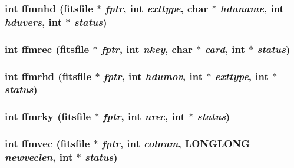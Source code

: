 \subsubsection{\setlength{\rightskip}{0pt plus 5cm}int ffmnhd (\bf{fitsfile} $\ast$ {\em fptr}, int {\em exttype}, char $\ast$ {\em hduname}, int {\em hduvers}, int $\ast$ {\em status})}\label{test_2roimasker_2fitsio_8h_84dd226ce5315b62afba4631346d486f}


\subsubsection{\setlength{\rightskip}{0pt plus 5cm}int ffmrec (\bf{fitsfile} $\ast$ {\em fptr}, int {\em nkey}, char $\ast$ {\em card}, int $\ast$ {\em status})}\label{test_2roimasker_2fitsio_8h_64f0b7aa1396fb5dc63502db966f8acd}


\subsubsection{\setlength{\rightskip}{0pt plus 5cm}int ffmrhd (\bf{fitsfile} $\ast$ {\em fptr}, int {\em hdumov}, int $\ast$ {\em exttype}, int $\ast$ {\em status})}\label{test_2roimasker_2fitsio_8h_d81f4e1c55fec210faa6343d3ed455ce}


\subsubsection{\setlength{\rightskip}{0pt plus 5cm}int ffmrky (\bf{fitsfile} $\ast$ {\em fptr}, int {\em nrec}, int $\ast$ {\em status})}\label{test_2roimasker_2fitsio_8h_d22c9244b2bef12cd893ff4e514f49fb}


\subsubsection{\setlength{\rightskip}{0pt plus 5cm}int ffmvec (\bf{fitsfile} $\ast$ {\em fptr}, int {\em colnum}, \bf{LONGLONG} {\em newveclen}, int $\ast$ {\em status})}\label{test_2roimasker_2fitsio_8h_4d65fa6c7cdfb529d91ceeed740985b3}


